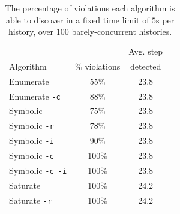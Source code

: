 \begin{table}[t]
  \footnotesize
  \centering
  \setlength{\tabcolsep}{1.8mm}
  \begin{tabular}{lccc}
   	          & 	              & Avg. step \\
    Algorithm & $\%$ violations & detected  \\
    \hline
    {\sc Enumerate}             & 55$\%$  & 23.8 \\
    {\sc Enumerate} {\tt -c}    & 88$\%$  & 23.8 \\
    {\sc Symbolic}              & 75$\%$  & 23.8 \\
    {\sc Symbolic} {\tt -r}     & 78$\%$  & 23.8 \\
    {\sc Symbolic} {\tt -i}     & 90$\%$  & 23.8 \\
    {\sc Symbolic} {\tt -c}     & 100$\%$ & 23.8 \\
    {\sc Symbolic} {\tt -c -i}  & 100$\%$ & 23.8 \\
    {\sc Saturate}              & 100$\%$ & 24.2 \\
    {\sc Saturate} {\tt -r}     & 100$\%$ & 24.2
  \end{tabular} 

  \caption{The percentage of violations each algorithm is able to discover in a
  fixed time limit of $5$s per history, over $100$ barely-concurrent histories.}
  \label{tab:exp:seq}
\end{table}
